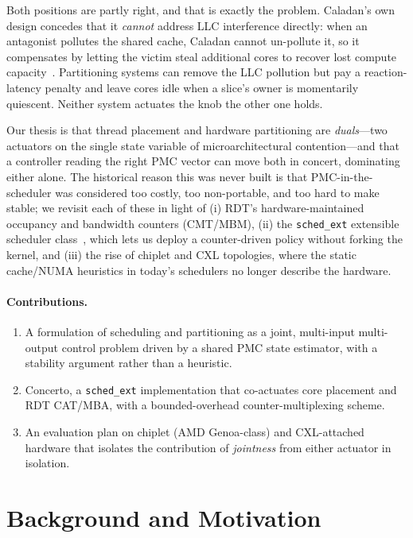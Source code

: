 \documentclass[sigconf,nonacm]{acmart}
\begin{document}
Both positions are partly right, and that is exactly the problem. Caladan's own
design concedes that it \emph{cannot} address LLC interference directly: when an
antagonist pollutes the shared cache, Caladan cannot un-pollute it, so it
compensates by letting the victim steal additional cores to recover lost compute
capacity~\cite{fried2020caladan}. Partitioning systems can remove the LLC
pollution but pay a reaction-latency penalty and leave cores idle when a slice's
owner is momentarily quiescent. Neither system actuates the knob the other one
holds.

Our thesis is that thread placement and hardware partitioning are
\emph{duals}---two actuators on the single state variable of microarchitectural
contention---and that a controller reading the right PMC vector can move both in
concert, dominating either alone. The historical reason this was never built is
that PMC-in-the-scheduler was considered too costly, too non-portable, and too
hard to make stable; we revisit each of these in light of (i) RDT's
hardware-maintained occupancy and bandwidth counters (CMT/MBM), (ii) the
\texttt{sched\_ext} extensible scheduler class~\cite{linux-schedext}, which lets
us deploy a counter-driven policy without forking the kernel, and (iii) the rise
of chiplet and CXL topologies, where the static cache/NUMA heuristics in today's
schedulers no longer describe the hardware.

\paragraph{Contributions.}
\begin{enumerate}
\item A formulation of scheduling and partitioning as a joint, multi-input
multi-output control problem driven by a shared PMC state estimator, with a
stability argument rather than a heuristic.
\item Concerto, a \texttt{sched\_ext} implementation that co-actuates core
placement and RDT CAT/MBA, with a bounded-overhead counter-multiplexing scheme.
\item An evaluation plan on chiplet (AMD Genoa-class) and CXL-attached hardware
that isolates the contribution of \emph{jointness} from either actuator in
isolation.
\end{enumerate}

\section{Background and Motivation}
\end{document}
